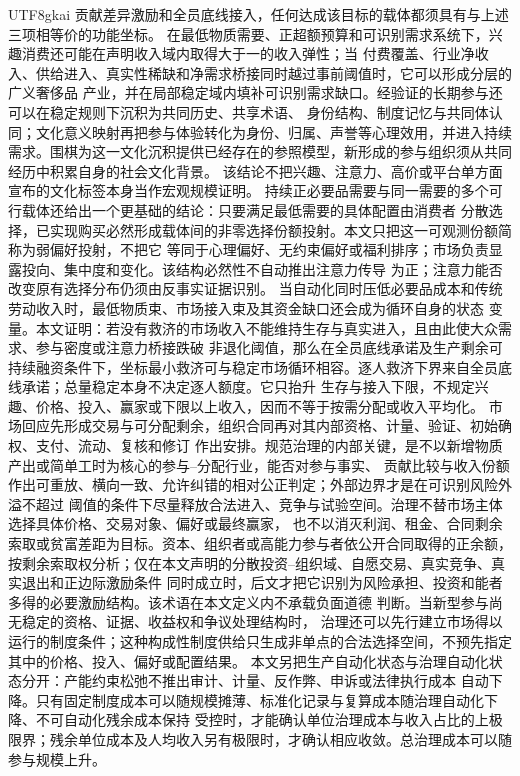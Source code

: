 \documentclass[12pt,a4paper,openany]{report}
\begin{document}
\begin{CJK*}{UTF8}{gkai}
贡献差异激励和全员底线接入，任何达成该目标的载体都须具有与上述三项相等价的功能坐标。
在最低物质需要、正超额预算和可识别需求系统下，兴趣消费还可能在声明收入域内取得大于一的收入弹性；当
付费覆盖、行业净收入、供给进入、真实性稀缺和净需求桥接同时越过事前阈值时，它可以形成分层的广义奢侈品
产业，并在局部稳定域内填补可识别需求缺口。经验证的长期参与还可以在稳定规则下沉积为共同历史、共享术语、
身份结构、制度记忆与共同体认同；文化意义映射再把参与体验转化为身份、归属、声誉等心理效用，并进入持续
需求。围棋为这一文化沉积提供已经存在的参照模型，新形成的参与组织须从共同经历中积累自身的社会文化背景。
该结论不把兴趣、注意力、高价或平台单方面宣布的文化标签本身当作宏观规模证明。
持续正必要品需要与同一需要的多个可行载体还给出一个更基础的结论：只要满足最低需要的具体配置由消费者
分散选择，已实现购买必然形成载体间的非零选择份额投射。本文只把这一可观测份额简称为弱偏好投射，不把它
等同于心理偏好、无约束偏好或福利排序；市场负责显露投向、集中度和变化。该结构必然性不自动推出注意力传导
为正；注意力能否改变原有选择分布仍须由反事实证据识别。
当自动化同时压低必要品成本和传统劳动收入时，最低物质束、市场接入束及其资金缺口还会成为循环自身的状态
变量。本文证明：若没有救济的市场收入不能维持生存与真实进入，且由此使大众需求、参与密度或注意力桥接跌破
非退化阈值，那么在全员底线承诺及生产剩余可持续融资条件下，坐标最小救济可与稳定市场循环相容。逐人救济下界来自全员底线承诺；总量稳定本身不决定逐人额度。它只抬升
生存与接入下限，不规定兴趣、价格、投入、赢家或下限以上收入，因而不等于按需分配或收入平均化。
市场回应先形成交易与可分配剩余，组织合同再对其内部资格、计量、验证、初始确权、支付、流动、复核和修订
作出安排。规范治理的内部关键，是不以新增物质产出或简单工时为核心的参与--分配行业，能否对参与事实、
贡献比较与收入份额作出可重放、横向一致、允许纠错的相对公正判定；外部边界才是在可识别风险外溢不超过
阈值的条件下尽量释放合法进入、竞争与试验空间。治理不替市场主体选择具体价格、交易对象、偏好或最终赢家，
也不以消灭利润、租金、合同剩余索取或贫富差距为目标。资本、组织者或高能力参与者依公开合同取得的正余额，按剩余索取权分析；仅在本文声明的分散投资--组织域、自愿交易、真实竞争、真实退出和正边际激励条件
同时成立时，后文才把它识别为风险承担、投资和能者多得的必要激励结构。该术语在本文定义内不承载负面道德
判断。当新型参与尚无稳定的资格、证据、收益权和争议处理结构时，
治理还可以先行建立市场得以运行的制度条件；这种构成性制度供给只生成非单点的合法选择空间，不预先指定
其中的价格、投入、偏好或配置结果。
本文另把生产自动化状态与治理自动化状态分开：产能约束松弛不推出审计、计量、反作弊、申诉或法律执行成本
自动下降。只有固定制度成本可以随规模摊薄、标准化记录与复算成本随治理自动化下降、不可自动化残余成本保持
受控时，才能确认单位治理成本与收入占比的上极限界；残余单位成本及人均收入另有极限时，才确认相应收敛。总治理成本可以随参与规模上升。

\end{CJK*}
\end{document}
